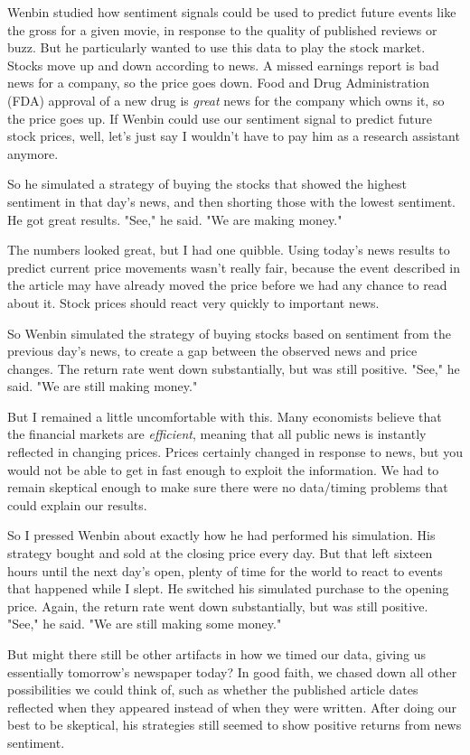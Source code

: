 \documentclass[10pt]{article}
\begin{document}
Wenbin studied how sentiment signals could be used to predict future events like the gross for a given movie, in response to the quality of published reviews or buzz. But he particularly wanted to use this data to play the stock market. Stocks move up and down according to news. A missed earnings report is bad news for a company, so the price goes down. Food and Drug Administration (FDA) approval of a new drug is \textit{great} news for the company which owns it, so the price goes up. If Wenbin could use our sentiment signal to predict future stock prices, well, let's just say I wouldn't have to pay him as a research assistant anymore.

So he simulated a strategy of buying the stocks that showed the highest sentiment in that day's news, and then shorting those with the lowest sentiment. He got great results. "See," he said. "We are making money."

The numbers looked great, but I had one quibble. Using today's news results to predict current price movements wasn't really fair, because the event described in the article may have already moved the price before we had any chance to read about it. Stock prices should react very quickly to important news.

So Wenbin simulated the strategy of buying stocks based on sentiment from the previous day's news, to create a gap between the observed news and price changes. The return rate went down substantially, but was still positive. "See," he said. "We are still making money."

But I remained a little uncomfortable with this. Many economists believe that the financial markets are \textit{efficient}, meaning that all public news is instantly reflected in changing prices. Prices certainly changed in response to news, but you would not be able to get in fast enough to exploit the information. We had to remain skeptical enough to make sure there were no data/timing problems that could explain our results.

So I pressed Wenbin about exactly how he had performed his simulation. His strategy bought and sold at the closing price every day. But that left sixteen hours until the next day's open, plenty of time for the world to react to events that happened while I slept. He switched his simulated purchase to the opening price. Again, the return rate went down substantially, but was still positive. "See," he said. "We are still making some money."

But might there still be other artifacts in how we timed our data, giving us essentially tomorrow's newspaper today? In good faith, we chased down all other possibilities we could think of, such as whether the published article dates reflected when they appeared instead of when they were written. After doing our best to be skeptical, his strategies still seemed to show positive returns from news sentiment.
\end{document}

